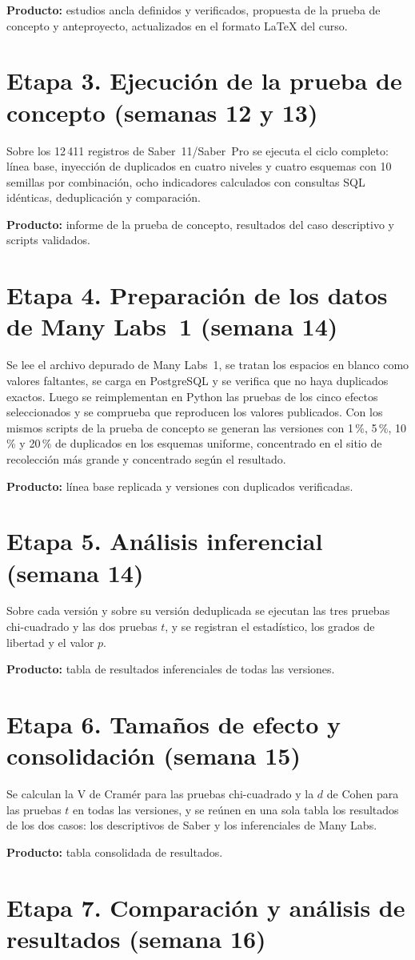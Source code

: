 \documentclass[11pt,openany,oneside,letterpaper]{book}
\newcommand{\seccioncorta}[2]{{\renewcommand{\sectionmark}[1]{}\section{#2}}\markright{\MakeUppercase{\thesection.\ #1}}}
\begin{document}
\textbf{Producto:} estudios ancla definidos y verificados, propuesta de la prueba de concepto y anteproyecto, actualizados en el formato \LaTeX{} del curso.

\seccioncorta{Etapa 3}{Etapa 3. Ejecución de la prueba de concepto (semanas 12 y 13)}

Sobre los 12\,411 registros de Saber~11/Saber~Pro se ejecuta el ciclo completo: línea base, inyección de duplicados en cuatro niveles y cuatro esquemas con 10 semillas por combinación, ocho indicadores calculados con consultas SQL idénticas, deduplicación y comparación.

\textbf{Producto:} informe de la prueba de concepto, resultados del caso descriptivo y scripts validados.

\seccioncorta{Etapa 4}{Etapa 4. Preparación de los datos de Many Labs~1 (semana 14)}

Se lee el archivo depurado de Many Labs~1, se tratan los espacios en blanco como valores faltantes, se carga en PostgreSQL y se verifica que no haya duplicados exactos. Luego se reimplementan en Python las pruebas de los cinco efectos seleccionados y se comprueba que reproducen los valores publicados. Con los mismos scripts de la prueba de concepto se generan las versiones con 1\,\%, 5\,\%, 10\,\% y 20\,\% de duplicados en los esquemas uniforme, concentrado en el sitio de recolección más grande y concentrado según el resultado.

\textbf{Producto:} línea base replicada y versiones con duplicados verificadas.

\seccioncorta{Etapa 5}{Etapa 5. Análisis inferencial (semana 14)}

Sobre cada versión y sobre su versión deduplicada se ejecutan las tres pruebas chi-cuadrado y las dos pruebas $t$, y se registran el estadístico, los grados de libertad y el valor $p$.

\textbf{Producto:} tabla de resultados inferenciales de todas las versiones.

\seccioncorta{Etapa 6}{Etapa 6. Tamaños de efecto y consolidación (semana 15)}

Se calculan la V de Cramér para las pruebas chi-cuadrado y la $d$ de Cohen para las pruebas $t$ en todas las versiones, y se reúnen en una sola tabla los resultados de los dos casos: los descriptivos de Saber y los inferenciales de Many Labs.

\textbf{Producto:} tabla consolidada de resultados.

\seccioncorta{Etapa 7}{Etapa 7. Comparación y análisis de resultados (semana 16)}
\end{document}

